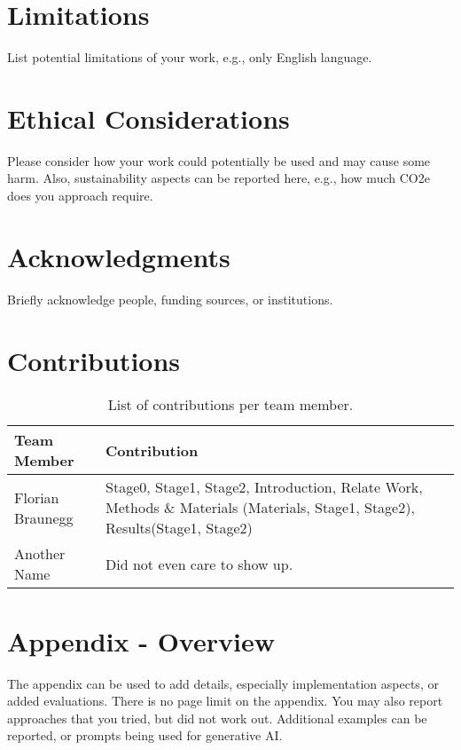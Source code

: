 \documentclass[12pt,a4paper,twocolumn]{article}
\begin{document}
\section*{Limitations}
List potential limitations of your work, e.g., only English language.

\section*{Ethical Considerations}
Please consider how your work could potentially be used and may cause some harm.
Also, sustainability aspects can be reported here, e.g., how much CO2e does you approach require.

\section*{Acknowledgments}
Briefly acknowledge people, funding sources, or institutions.

\section*{Contributions}
\begin{table}[h!]
    \centering
    \caption{List of contributions per team member.}
    \label{tab:contributions}
    \begin{tabular}{lp{4cm}}
        \toprule
        \textbf{Team Member} & \textbf{Contribution} \\
        \midrule
        Florian Braunegg           & Stage0, Stage1, Stage2, Introduction, Relate Work, Methods \& Materials (Materials, Stage1, Stage2), Results(Stage1, Stage2)             \\
        Another Name    & Did not even care to show up.    \\
        \bottomrule
    \end{tabular}
\end{table}




\appendix

\section{Appendix - Overview}

The appendix can be used to add details, especially implementation aspects, or added evaluations.
There is no page limit on the appendix.
You may also report approaches that you tried, but did not work out.
Additional examples can be reported, or prompts being used for generative AI.
\end{document}
